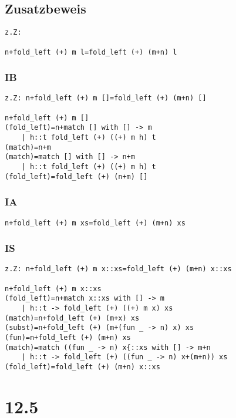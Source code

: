 \documentclass{article}
\begin{document}
\subsection*{Zusatzbeweis}

\begin{lstlisting}
z.Z:

n+fold_left (+) m l=fold_left (+) (m+n) l
\end{lstlisting}

\subsubsection*{IB}

\begin{lstlisting}
z.Z: n+fold_left (+) m []=fold_left (+) (m+n) []

n+fold_left (+) m []
(fold_left)=n+match [] with [] -> m
	| h::t fold_left (+) ((+) m h) t
(match)=n+m
(match)=match [] with [] -> n+m
	| h::t fold_left (+) ((+) m h) t
(fold_left)=fold_left (+) (n+m) []
\end{lstlisting}

\subsubsection*{IA}

\begin{lstlisting}
n+fold_left (+) m xs=fold_left (+) (m+n) xs
\end{lstlisting}

\subsubsection*{IS}

\begin{lstlisting}
z.Z: n+fold_left (+) m x::xs=fold_left (+) (m+n) x::xs

n+fold_left (+) m x::xs
(fold_left)=n+match x::xs with [] -> m
	| h::t -> fold_left (+) ((+) m x) xs
(match)=n+fold_left (+) (m+x) xs
(subst)=n+fold_left (+) (m+(fun _ -> n) x) xs
(fun)=n+fold_left (+) (m+n) xs
(match)=match ((fun _ -> n) x{::xs with [] -> m+n
	| h::t -> fold_left (+) ((fun _ -> n) x+(m+n)) xs
(fold_left)=fold_left (+) (m+n) x::xs
\end{lstlisting}

\section*{12.5}
\end{document}
